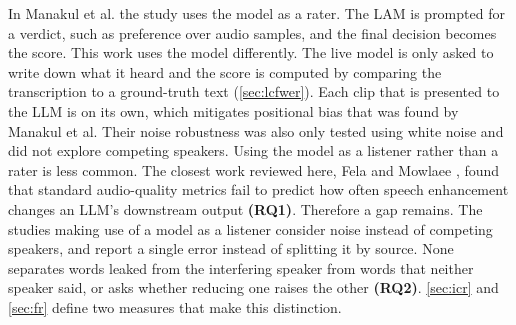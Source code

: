 In Manakul et al. the study uses the model as a rater. The LAM is prompted for a verdict, such as preference over audio samples, and the final decision becomes the score. This work uses the model differently. The live model is only asked to write down what it heard and the score is computed by comparing the transcription to a ground-truth text (\autoref{sec:lcfwer}). Each clip that is presented to the LLM is on its own, which mitigates positional bias that was found by Manakul et al. Their noise robustness was also only tested using white noise and did not explore competing speakers. Using the model as a listener rather than a rater is less common. The closest work reviewed here, Fela and Mowlaee \cite{fela2026perceptually}, found that standard audio-quality metrics fail to predict how often speech enhancement changes an LLM's downstream output \textbf{(RQ1)}. Therefore a gap remains. The studies making use of a model as a listener consider noise instead of competing speakers, and report a single error instead of splitting it by source. None separates words leaked from the interfering speaker from words that neither speaker said, or asks whether reducing one raises the other \textbf{(RQ2)}. \autoref{sec:icr} and \autoref{sec:fr} define two measures that make this distinction.
